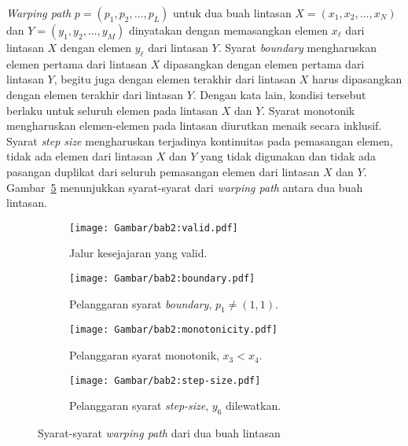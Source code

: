 \textit{Warping path} $p = (p_1, p_2, \ldots, p_L)$ untuk dua buah lintasan $X = (x_1, x_2, \ldots, x_N)$ dan $Y = (y_1, y_2, \ldots, y_M)$ dinyatakan dengan memasangkan elemen $x_\ell$ dari lintasan $X$ dengan elemen $y_\ell$ dari lintasan $Y$. Syarat \textit{boundary} mengharuskan elemen pertama dari lintasan $X$ dipasangkan dengan elemen pertama dari lintasan $Y$, begitu juga dengan elemen terakhir dari lintasan $X$ harus dipasangkan dengan elemen terakhir dari lintasan $Y$. Dengan kata lain, kondisi tersebut berlaku untuk seluruh elemen pada lintasan $X$ dan $Y$. Syarat monotonik mengharuskan elemen-elemen pada lintasan diurutkan menaik secara inklusif. Syarat \textit{step size} mengharuskan terjadinya kontinuitas pada pemasangan elemen, tidak ada elemen dari lintasan $X$ dan $Y$ yang tidak digunakan dan tidak ada pasangan duplikat dari seluruh pemasangan elemen dari lintasan $X$ dan $Y$. Gambar~\ref{bab2:dtw-requirements} menunjukkan syarat-syarat dari \textit{warping path} antara dua buah lintasan.

\vspace{10pt}

\begin{figure}[h]
    \centering
    \begin{subfigure}[ht]{0.23\textwidth}
        \centering
        \texttt{[image: Gambar/bab2:valid.pdf]}
        \caption{Jalur kesejajaran yang valid.}
        \label{bab2:valid}
    \end{subfigure}
    \begin{subfigure}[ht]{0.23\textwidth}
        \centering
        \texttt{[image: Gambar/bab2:boundary.pdf]}
        \caption{Pelanggaran syarat \textit{boundary}, $p_1 \neq (1, 1)$.}
        \label{bab2:boundary}
    \end{subfigure}
    \begin{subfigure}[ht]{0.23\textwidth}
        \centering
        \texttt{[image: Gambar/bab2:monotonicity.pdf]}
        \caption{Pelanggaran syarat monotonik, $x_3 < x_4$.}
        \label{bab2:monotonicity}
    \end{subfigure}
    \begin{subfigure}[h]{0.23\textwidth}
        \centering
        \texttt{[image: Gambar/bab2:step-size.pdf]}
        \caption{Pelanggaran syarat \textit{step-size}, $y_6$ dilewatkan.}
        \label{bab2:step-size}
    \end{subfigure}
    \caption[Syarat-syarat \textit{warping path}]{Syarat-syarat \textit{warping path} dari dua buah lintasan}
    \label{bab2:dtw-requirements}
\end{figure}

